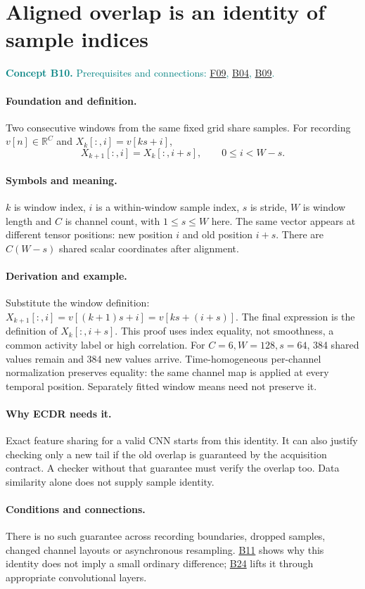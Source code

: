 \documentclass[11pt,a4paper]{article}
\newcommand{\R}{\mathbb R}
\newcommand{\conceptid}{Front matter}
\newcommand{\concept}[3]{\clearpage\renewcommand{\conceptid}{#1}%
\section{#2}\label{concept:#1}%
\textcolor{teal}{\textbf{Concept #1.} Prerequisites and connections: #3.}\par
\typeout{ECDR-CONCEPT-START #1 PAGE=\thepage}}
\begin{document}
\concept{B10}{Aligned overlap is an identity of sample indices}{\hyperref[concept:F09]{F09}, \hyperref[concept:B04]{B04}, \hyperref[concept:B09]{B09}}
\paragraph{Foundation and definition.}
Two consecutive windows from the same fixed grid share samples. For
recording $v[n]\in\R^C$ and $X_k[:,i]=v[ks+i]$,
\[
 X_{k+1}[:,i]=X_k[:,i+s],\qquad 0\le i<W-s.
\]
\paragraph{Symbols and meaning.}
$k$ is window index, $i$ is a within-window sample index, $s$ is stride,
$W$ is window length and $C$ is channel count, with $1\le s\le W$ here. The same vector appears at
different tensor positions: new position $i$ and old position $i+s$.
There are $C(W-s)$ shared scalar coordinates after alignment.
\paragraph{Derivation and example.}
Substitute the window definition:
$X_{k+1}[:,i]=v[(k+1)s+i]=v[ks+(i+s)]$.
The final expression is the definition of $X_k[:,i+s]$. This proof uses
index equality, not smoothness, a common activity label or high correlation.
For $C=6,W=128,s=64$, 384 shared values remain and 384 new values arrive.
Time-homogeneous per-channel normalization preserves equality: the same
channel map is applied at every temporal position. Separately fitted window means need
not preserve it.
\paragraph{Why ECDR needs it.}
Exact feature sharing for a valid CNN starts from this identity. It can
also justify checking only a new tail if the old overlap is guaranteed by
the acquisition contract. A checker without that guarantee must verify the
overlap too. Data similarity alone does not supply sample identity.
\paragraph{Conditions and connections.}
There is no such guarantee across recording boundaries, dropped samples,
changed channel layouts or asynchronous resampling. \hyperref[concept:B11]{B11} shows why this
identity does not imply a small ordinary difference; \hyperref[concept:B24]{B24} lifts it through
appropriate convolutional layers.
\par\label{endconcept:B10}
\end{document}
